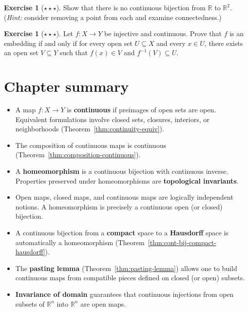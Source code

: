 \documentclass[11pt,a4paper,twoside]{book}
\theoremstyle{remark}
\theoremstyle{definition}
\newtheorem{exerciseplain}[theorem]{Exercise}
\theoremstyle{definition}
\newenvironment{exercise}[1][]{%
  \begin{exerciseplain}[#1]
}{%
  \end{exerciseplain}
}
\begin{document}
\begin{exercise}[$\star\star\star$]
\label{exer:cont-bij-R-to-R2}
Show that there is no continuous bijection from $\mathbb{R}$ to
$\mathbb{R}^2$.  (\textit{Hint:} consider removing a point from each and
examine connectedness.)
\end{exercise}

\begin{exercise}[$\star\star\star$]
\label{exer:embedding-characterization}
Let $f\colon X\to Y$ be injective and continuous.  Prove that $f$ is an
embedding if and only if for every open set $U\subseteq X$ and every
$x\in U$, there exists an open set $V\subseteq Y$ such that
$f(x)\in V$ and $f^{-1}(V)\subseteq U$.
\end{exercise}

\section*{Chapter summary}

\begin{itemize}
    \item A map $f\colon X\to Y$ is \textbf{continuous} if preimages of open
        sets are open.  Equivalent formulations involve closed sets, closures,
        interiors, or neighborhoods (Theorem~\ref{thm:continuity-equiv}).
    \item The composition of continuous maps is continuous
        (Theorem~\ref{thm:composition-continuous}).
    \item A \textbf{homeomorphism} is a continuous bijection with continuous
        inverse.  Properties preserved under homeomorphisms are
        \textbf{topological invariants}.
    \item Open maps, closed maps, and continuous maps are logically independent
        notions.  A homeomorphism is precisely a continuous open (or closed)
        bijection.
    \item A continuous bijection from a \textbf{compact} space to a
        \textbf{Hausdorff} space is automatically a homeomorphism
        (Theorem~\ref{thm:cont-bij-compact-hausdorff}).
    \item The \textbf{pasting lemma} (Theorem~\ref{thm:pasting-lemma}) allows
        one to build continuous maps from compatible pieces defined on closed
        (or open) subsets.
    \item \textbf{Invariance of domain} guarantees that continuous injections
        from open subsets of $\mathbb{R}^n$ into $\mathbb{R}^n$ are open maps.
\end{itemize}
\end{document}
